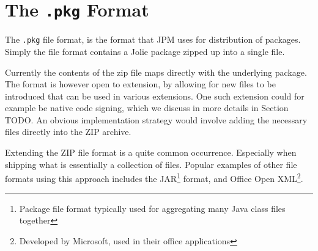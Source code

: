 \section{The {\tt .pkg} Format} \label{sec:pkg}

The \verb!.pkg! file format, is the format that JPM uses for distribution of
packages. Simply the file format contains a Jolie package zipped up into a
single file.

Currently the contents of the zip file maps directly with the underlying
package. The format is however open to extension, by allowing for new files to
be introduced that can be used in various extensions. One such extension could
for example be native code signing, which we discuss in more details in Section
TODO. An obvious implementation strategy would involve adding the necessary
files directly into the ZIP archive.

Extending the ZIP file format is a quite common occurrence. Especially when
shipping what is essentially a collection of files. Popular examples of other
file formats using this approach includes the JAR\footnote{Package file format
    typically used for aggregating many Java class files together} format, and
    Office Open XML\footnote{Developed by Microsoft, used in their office
        applications}.
